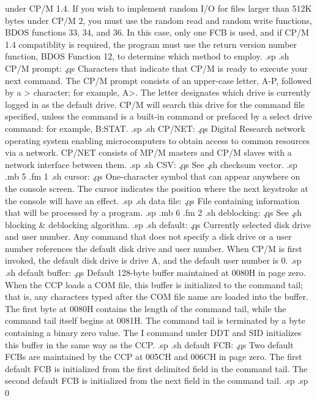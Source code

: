 under CP/M 1.4.  If you wish to implement random I/O for files 
larger than 512K bytes under CP/M 2, you must use the random read 
and random write functions, BDOS functions 33, 34, and 36.  In 
this case, only one FCB is used, and if CP/M 1.4 compatiblity is 
required, the program must use the return version number 
function, BDOS Function 12, to determine which method to employ.
.sp
.sh
CP/M prompt:  \c
.qs
Characters that indicate that CP/M is ready to execute your next 
command.  The CP/M prompt consists of an upper-case letter, A-P, 
followed by a > character; for example, A>.  The letter 
designates which drive is currently logged in as the default 
drive.  CP/M will search this drive for the command file 
specified, unless the command is a built-in command or prefaced 
by a select drive command: for example, B:STAT.
.sp
.sh
CP/NET:  \c
.qs
Digital Research network operating system enabling microcomputers 
to obtain access to common resources via a network.  CP/NET 
consists of MP/M masters and CP/M slaves with a network interface 
between them.
.sp
.sh
CSV:  \c
.qs
See \c
.sh
checksum vector.
.sp
.mb 5
.fm 1
.sh
cursor:  \c
.qs
One-character symbol that can appear anywhere on the console 
screen.  The cursor indicates the position where the next 
keystroke at the console will have an effect.
.sp
.sh
data file:  \c
.qs
File containing information that will be processed by a program.
.sp
.mb 6
.fm 2
.sh
deblocking:  \c
.qs
See \c
.sh
blocking & deblocking algorithm.
.sp
.sh
default:  \c
.qs
Currently selected disk drive and user number.  Any command that 
does not specify a disk drive or a user number references the 
default disk drive and user number.  When CP/M is first invoked, 
the default disk drive is drive A, and the default user number is 
0.
.sp
.sh
default buffer:  \c
.qs
Default 128-byte buffer maintained at 0080H in page zero.  When 
the CCP loads a COM file, this buffer is initialized to the 
command tail; that is, any characters typed after the COM file 
name are loaded into the buffer.  The first byte at 0080H 
contains the length of the command tail, while the command tail 
itself begins at 0081H.  The command tail is terminated by a byte 
containing a binary zero value.  The I command under DDT and SID 
initializes this buffer in the same way as the CCP.
.sp
.sh
default FCB:  \c
.qs
Two default FCBs are maintained by the CCP at 005CH and 006CH in 
page zero.  The first default FCB is initialized from the first 
delimited field in the command tail.  The second default FCB 
is initialized from the next field in the command tail.
.sp
.sp 0

